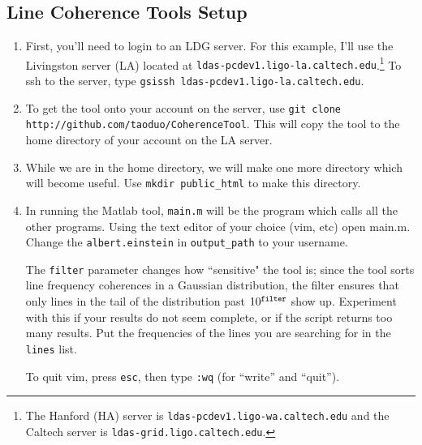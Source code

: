 \documentclass[11pt]{article}
\begin{document}
\subsection*{Line Coherence Tools Setup}
\begin{enumerate}
	\item First, you'll need to login to an LDG server. For this example, I'll use the Livingston server (LA) located at {\tt ldas-pcdev1.ligo-la.caltech.edu}.\footnote{The Hanford (HA) server is {\tt ldas-pcdev1.ligo-wa.caltech.edu} and the Caltech server is {\tt ldas-grid.ligo.caltech.edu}.} To ssh to the server, type {\tt gsissh ldas-pcdev1.ligo-la.caltech.edu}.
	\item To get the tool onto your account on the server, use {\tt  git clone \break http://github.com/taoduo/CoherenceTool}. This will copy the tool to the home directory of your account on the LA server.
	\item While we are in the home directory, we will make one more directory which will become useful. Use {\tt mkdir public\_html} to make this directory.
    \item In running the Matlab tool, {\tt main.m} will be the program which calls all the other programs. Using the text editor of your choice (vim, etc) open main.m. Change the {\tt albert.einstein} in {\tt output\_path} to your username.

The {\tt filter} parameter changes how ``sensitive" the tool is; since the tool sorts line frequency coherences in a Gaussian distribution, the filter ensures that only lines in the tail of the distribution past $10^{\tt filter}$ show up. Experiment with this if your results do not seem complete, or if the script returns too many results. Put the frequencies of the lines you are searching for in the {\tt lines} list.

To quit vim, press {\tt esc}, then type {\tt :wq} (for ``write'' and ``quit'').
\end{enumerate}


\lstset{language=html}
\end{document}
